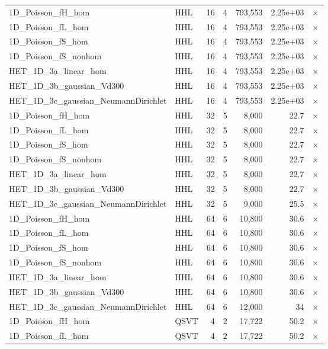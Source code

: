 \begin{table}[htbp]
\begin{tabular}{llrrrrl}
    1D\_Poisson\_fH\_hom & HHL & 16 & 4 & 793,553 & 2.25e+03 & $\times$ \\
    1D\_Poisson\_fL\_hom & HHL & 16 & 4 & 793,553 & 2.25e+03 & $\times$ \\
    1D\_Poisson\_fS\_hom & HHL & 16 & 4 & 793,553 & 2.25e+03 & $\times$ \\
    1D\_Poisson\_fS\_nonhom & HHL & 16 & 4 & 793,553 & 2.25e+03 & $\times$ \\
    HET\_1D\_3a\_linear\_hom & HHL & 16 & 4 & 793,553 & 2.25e+03 & $\times$ \\
    HET\_1D\_3b\_gaussian\_Vd300 & HHL & 16 & 4 & 793,553 & 2.25e+03 & $\times$ \\
    HET\_1D\_3c\_gaussian\_NeumannDirichlet & HHL & 16 & 4 & 793,553 & 2.25e+03 & $\times$ \\
    1D\_Poisson\_fH\_hom & HHL & 32 & 5 & 8,000 & 22.7 & $\times$ \\
    1D\_Poisson\_fL\_hom & HHL & 32 & 5 & 8,000 & 22.7 & $\times$ \\
    1D\_Poisson\_fS\_hom & HHL & 32 & 5 & 8,000 & 22.7 & $\times$ \\
    1D\_Poisson\_fS\_nonhom & HHL & 32 & 5 & 8,000 & 22.7 & $\times$ \\
    HET\_1D\_3a\_linear\_hom & HHL & 32 & 5 & 8,000 & 22.7 & $\times$ \\
    HET\_1D\_3b\_gaussian\_Vd300 & HHL & 32 & 5 & 8,000 & 22.7 & $\times$ \\
    HET\_1D\_3c\_gaussian\_NeumannDirichlet & HHL & 32 & 5 & 9,000 & 25.5 & $\times$ \\
    1D\_Poisson\_fH\_hom & HHL & 64 & 6 & 10,800 & 30.6 & $\times$ \\
    1D\_Poisson\_fL\_hom & HHL & 64 & 6 & 10,800 & 30.6 & $\times$ \\
    1D\_Poisson\_fS\_hom & HHL & 64 & 6 & 10,800 & 30.6 & $\times$ \\
    1D\_Poisson\_fS\_nonhom & HHL & 64 & 6 & 10,800 & 30.6 & $\times$ \\
    HET\_1D\_3a\_linear\_hom & HHL & 64 & 6 & 10,800 & 30.6 & $\times$ \\
    HET\_1D\_3b\_gaussian\_Vd300 & HHL & 64 & 6 & 10,800 & 30.6 & $\times$ \\
    HET\_1D\_3c\_gaussian\_NeumannDirichlet & HHL & 64 & 6 & 12,000 & 34 & $\times$ \\
    1D\_Poisson\_fH\_hom & QSVT & 4 & 2 & 17,722 & 50.2 & $\times$ \\
    1D\_Poisson\_fL\_hom & QSVT & 4 & 2 & 17,722 & 50.2 & $\times$ \\

\end{tabular}
\end{table}

